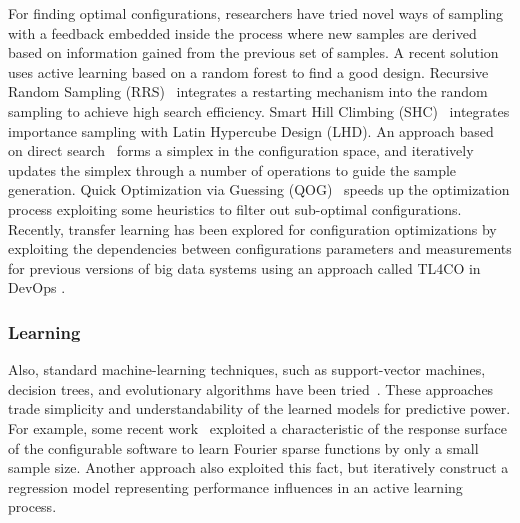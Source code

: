 For finding optimal configurations, researchers have tried novel ways of sampling with a feedback embedded inside the process where new samples are derived based on information gained from the previous set of samples. A recent solution \cite{bodin2016integrating} uses active learning based on a random forest to find a good design.
Recursive Random Sampling (RRS)~\cite{ye2003recursive} integrates a restarting mechanism into the random sampling to achieve high search efficiency. Smart Hill Climbing (SHC)~\cite{xi2004smart} integrates importance sampling with Latin Hypercube Design (LHD). %
An approach based on direct search~\cite{Zheng2007} forms a simplex in the configuration space, and iteratively updates the simplex through a number of operations to guide the sample generation. Quick Optimization via Guessing (QOG)~\cite{osogami2007optimizing} speeds up the optimization process exploiting some heuristics to filter out sub-optimal configurations. Recently, transfer learning has been explored for configuration optimizations by exploiting the dependencies between configurations parameters \cite{chen2009experience} and measurements for previous versions of big data systems using an approach called TL4CO in DevOps \cite{artavc2017dice}.  

\subsubsection{Learning} 
Also, standard machine-learning techniques, such as support-vector machines, decision trees, and evolutionary algorithms have been tried~\cite{jamshidi2016bo4co,yigitbasi2013towards}. These approaches trade simplicity and understandability of the learned models for predictive power. For example, some recent work~\cite{zhang2015performance} exploited a characteristic of the response surface of the configurable software to learn Fourier sparse functions by only a small sample size. Another approach \cite{influence} also exploited this fact, but iteratively construct a regression model representing performance influences in an active learning process.

